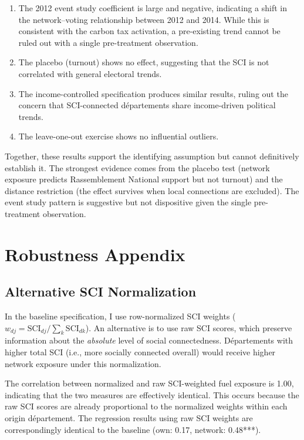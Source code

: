 \documentclass[12pt]{article}
\newcommand{\rn}{Rassemblement National}
\newcommand{\dept}{d\'{e}partement}
\newcommand{\depts}{d\'{e}partements}
\newcommand{\Depts}{D\'{e}partements}
\begin{document}
\begin{enumerate}
    \item The 2012 event study coefficient is large and negative, indicating a shift in the network--voting relationship between 2012 and 2014. While this is consistent with the carbon tax activation, a pre-existing trend cannot be ruled out with a single pre-treatment observation.
    \item The placebo (turnout) shows no effect, suggesting that the SCI is not correlated with general electoral trends.
    \item The income-controlled specification produces similar results, ruling out the concern that SCI-connected \depts{} share income-driven political trends.
    \item The leave-one-out exercise shows no influential outliers.
\end{enumerate}

Together, these results support the identifying assumption but cannot definitively establish it. The strongest evidence comes from the placebo test (network exposure predicts \rn{} support but not turnout) and the distance restriction (the effect survives when local connections are excluded). The event study pattern is suggestive but not dispositive given the single pre-treatment observation.



\section{Robustness Appendix}
\label{app:robustness}

\subsection{Alternative SCI Normalization}

In the baseline specification, I use row-normalized SCI weights ($w_{dj} = \text{SCI}_{dj} / \sum_k \text{SCI}_{dk}$). An alternative is to use raw SCI scores, which preserve information about the \textit{absolute} level of social connectedness. \Depts{} with higher total SCI (i.e., more socially connected overall) would receive higher network exposure under this normalization.

The correlation between normalized and raw SCI-weighted fuel exposure is 1.00, indicating that the two measures are effectively identical. This occurs because the raw SCI scores are already proportional to the normalized weights within each origin \dept{}. The regression results using raw SCI weights are correspondingly identical to the baseline (own: 0.17, network: 0.48***).
\end{document}

